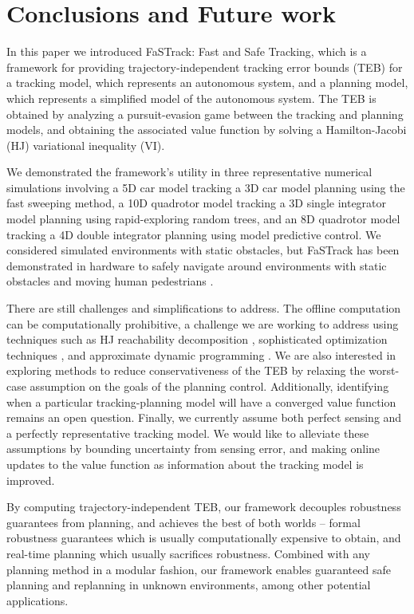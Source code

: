 \section{Conclusions and Future work}
In this paper we introduced FaSTrack: Fast and Safe Tracking, which is a framework for providing trajectory-independent tracking error bounds (TEB) for a tracking model, which represents an autonomous system, and a planning model, which represents a simplified model of the autonomous system.
The TEB is obtained by analyzing a pursuit-evasion game between the tracking and planning models, and obtaining the associated value function by solving a Hamilton-Jacobi (HJ) variational inequality (VI).  %

We demonstrated the framework's utility in three representative numerical simulations involving a 5D car model tracking a 3D car model planning using the fast sweeping method, a 10D quadrotor model tracking a 3D single integrator model planning using rapid-exploring random trees, and an 8D quadrotor model tracking a 4D double integrator planning using model predictive control. We considered simulated environments with static obstacles, but FaSTrack has been demonstrated in hardware to safely navigate around environments with static obstacles \cite{fridovich2018} and moving human pedestrians \cite{fisac2018probabilistically}.

There are still challenges and simplifications to address. The offline computation can be computationally prohibitive, a challenge we are working to address using techniques such as HJ reachability decomposition \cite{Chen2016DecouplingJournal,Chen2016DecouplingApprox}, sophisticated optimization techniques \cite{SinghChenEtAl2018}, and approximate dynamic programming \cite{royo2018classification}.  We are also interested in exploring methods to reduce conservativeness of the TEB by relaxing the worst-case assumption on the goals of the planning control.  Additionally, identifying when a particular tracking-planning model will have a converged value function remains an open question.  Finally, we currently assume both perfect sensing and a perfectly representative tracking model.  We would like to alleviate these assumptions by bounding uncertainty from sensing error, and making online updates to the value function as information about the tracking model is improved.

By computing trajectory-independent TEB, our framework decouples robustness guarantees from planning, and achieves the best of both worlds -- formal robustness guarantees which is usually computationally expensive to obtain, and real-time planning which usually sacrifices robustness.
Combined with any planning method in a modular fashion, our framework enables guaranteed safe planning and replanning in unknown environments, among other potential applications.